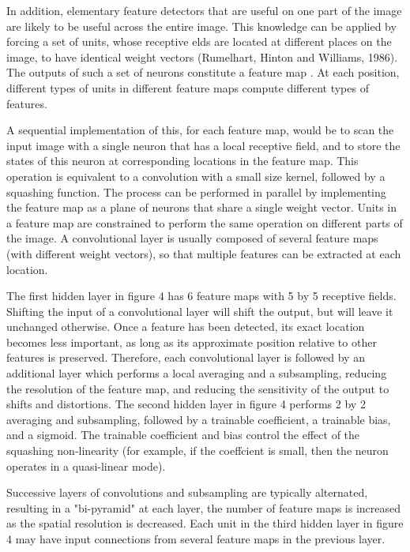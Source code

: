 \documentclass[conference]{IEEEtran}
\begin{document}
In addition, elementary feature detectors that are useful on one part of the image
are likely to be useful across the entire image. This knowledge can be applied by forcing a set of units, whose receptive elds are located at different places on the image, to have identical weight vectors (Rumelhart, Hinton and Williams, 1986). The outputs of such a set of neurons constitute a feature map . At each position, different types of units in different
feature maps compute different types of features.

A sequential implementation of this, for each feature map, would be to scan the input image with a single neuron that has a local receptive field, and to store the states of this neuron at corresponding locations in the feature map. This operation is equivalent to a convolution with a small size kernel, followed by a squashing function. The process can be performed in parallel by implementing the feature map as a plane of neurons that share a single weight vector. Units in a feature map are constrained to perform the same operation on different parts of the image. A convolutional layer is usually composed of several feature maps (with different weight vectors), so that
multiple features can be extracted at each location.

The first hidden layer in figure 4 has 6 feature maps with 5 by 5 receptive fields. Shifting the input of a convolutional layer will shift the output, but will leave it unchanged otherwise. Once a feature has been detected, its exact location becomes less important, as long as its approximate position relative to other features is preserved. Therefore, each convolutional layer is followed by an additional layer which performs a local averaging and a subsampling, reducing the resolution of the feature map, and reducing the sensitivity of the output to shifts and distortions. The second hidden layer in figure 4 performs 2 by 2 averaging and subsampling, followed by a trainable
coefficient, a trainable bias, and a sigmoid. The trainable coefficient and bias control the effect of the squashing non-linearity (for example, if the coeffcient is small, then the neuron operates in a quasi-linear mode).

Successive layers of convolutions and subsampling are typically alternated, resulting in a "bi-pyramid" at each layer, the number of feature maps is increased as the spatial resolution is decreased. Each unit in the third hidden layer in figure 4 may have input connections from several feature maps in the previous layer.
\end{document}
